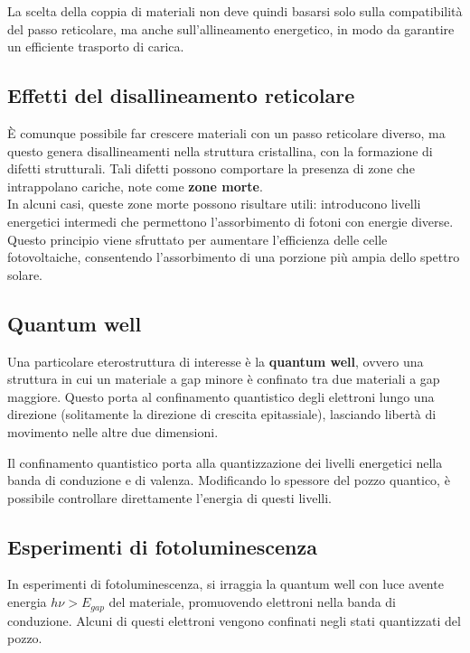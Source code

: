 La scelta della coppia di materiali non deve quindi basarsi solo sulla compatibilità del passo reticolare, ma anche sull’allineamento energetico, in modo da garantire un efficiente trasporto di carica.

\subsection{Effetti del disallineamento reticolare}

È comunque possibile far crescere materiali con un passo reticolare diverso, ma questo genera disallineamenti nella struttura cristallina, con la formazione di difetti strutturali. Tali difetti possono comportare la presenza di zone che intrappolano cariche, note come \textbf{zone morte}.
\\
In alcuni casi, queste zone morte possono risultare utili: introducono livelli energetici intermedi che permettono l’assorbimento di fotoni con energie diverse. \\
Questo principio viene sfruttato per aumentare l’efficienza delle celle fotovoltaiche, consentendo l’assorbimento di una porzione più ampia dello spettro solare.

\subsection{Quantum well}

Una particolare eterostruttura di interesse è la \textbf{quantum well}, ovvero una struttura in cui un materiale a gap minore è confinato tra due materiali a gap maggiore. Questo porta al confinamento quantistico degli elettroni lungo una direzione (solitamente la direzione di crescita epitassiale), lasciando libertà di movimento nelle altre due dimensioni.

Il confinamento quantistico porta alla quantizzazione dei livelli energetici nella banda di conduzione e di valenza. Modificando lo spessore del pozzo quantico, è possibile controllare direttamente l’energia di questi livelli.

\subsection{Esperimenti di fotoluminescenza}

In esperimenti di fotoluminescenza, si irraggia la quantum well con luce avente energia $h\nu > E_{gap}$ del materiale, promuovendo elettroni nella banda di conduzione. Alcuni di questi elettroni vengono confinati negli stati quantizzati del pozzo.

